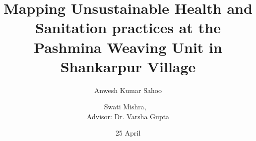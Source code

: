 \documentclass[journal]{IEEEtran}
\begin{document}
%
\title {Mapping Unsustainable Health and Sanitation practices at the Pashmina Weaving Unit in Shankarpur Village }
%
%
%

\author[1]{Anwesh Kumar Sahoo}
\author[1]{Swati Mishra, ~ \\{\small Advisor: Dr. Varsha Gupta}}

       

\date{25 April}


% 
%



\end{document}
